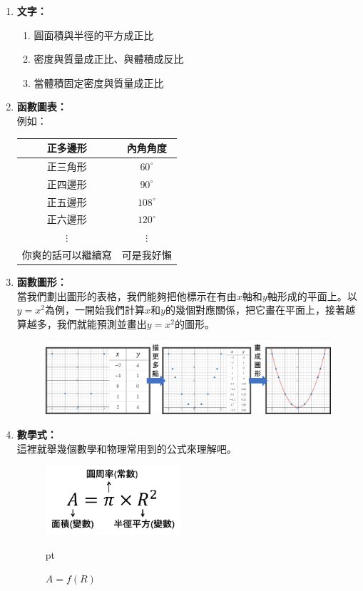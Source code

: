 \begin{enumerate}
	\item \textbf{文字：}
	\begin{enumerate}
		\item 圓面積與半徑的平方成正比
		\item 密度與質量成正比、與體積成反比
		\item 當體積固定密度與質量成正比
	\end{enumerate}
	\item \textbf{函數圖表：} \\
		例如： \\
		\begin{table}[H]
		\centering
		\begin{tabular}{|c|c|}
		\hline
		\textbf{正多邊形}      & \textbf{內角角度}  	    \\ \hline
		正三角形      & $60^\circ$    \\ \hline
		正四邊形      & $90^\circ$    \\ \hline
		正五邊形      & $108^\circ$    \\ \hline
		正六邊形      & $120^\circ$    \\ \hline
         $\vdots $ &  $\vdots $     \\ \hline
		你爽的話可以繼續寫 & 可是我好懶 \\ \hline
	
		\end{tabular}
		\end{table}
	\item \textbf{函數圖形：}\\
當我們劃出圖形的表格，我們能夠把他標示在有由$x$軸和$y$軸形成的平面上。以$y=x^2$為例，一開始我們計算$x$和$y$的幾個對應關係，把它畫在平面上，接著越算越多，我們就能預測並畫出$y=x^2$的圖形。
\begin{figure}[H]
\centering
\graphicspath{{physics/}}
\includegraphics[width=\textwidth, center]{function_graph.png}
\label{fig:function1}
\end{figure}

	\item \textbf{數學式：} \\
這裡就舉幾個數學和物理常用到的公式來理解吧。
		\begin{figure}[H]
		\centering
		\graphicspath{{physics/}}
		\includegraphics[width=5cm, center]{A.png}
		\caption{$A=f(R)$}  pt
		\label{fig:A}
		\end{figure}
				

\end{enumerate}
